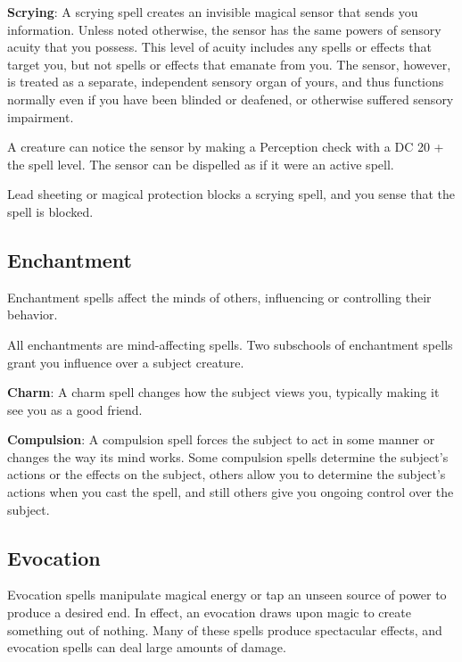 \textbf{Scrying}: A scrying spell creates an invisible magical sensor that sends you information. Unless noted otherwise, the sensor has the same powers of sensory acuity that you possess. This level of acuity includes any spells or effects that target you, but not spells or effects that emanate from you. The sensor, however, is treated as a separate, independent sensory organ of yours, and thus functions normally even if you have been blinded or deafened, or otherwise suffered sensory impairment.
				
A creature can notice the sensor by making a Perception check with a DC 20 + the spell level. The sensor can be dispelled as if it were an active spell.
				
Lead sheeting or magical protection blocks a scrying spell, and you sense that the spell is blocked.
				
\subsection{Enchantment}

				
Enchantment spells affect the minds of others, influencing or controlling their behavior.
				
All enchantments are mind-affecting spells. Two subschools of enchantment spells grant you influence over a subject creature.
				
\textbf{Charm}: A charm spell changes how the subject views you, typically making it see you as a good friend.
				
\textbf{Compulsion}: A compulsion spell forces the subject to act in some manner or changes the way its mind works. Some compulsion spells determine the subject's actions or the effects on the subject, others allow you to determine the subject's actions when you cast the spell, and still others give you ongoing control over the subject.
				
\subsection{Evocation}

				
Evocation spells manipulate magical energy or tap an unseen source of power to produce a desired end. In effect, an evocation draws upon magic to create something out of nothing. Many of these spells produce spectacular effects, and evocation spells can deal large amounts of damage.

